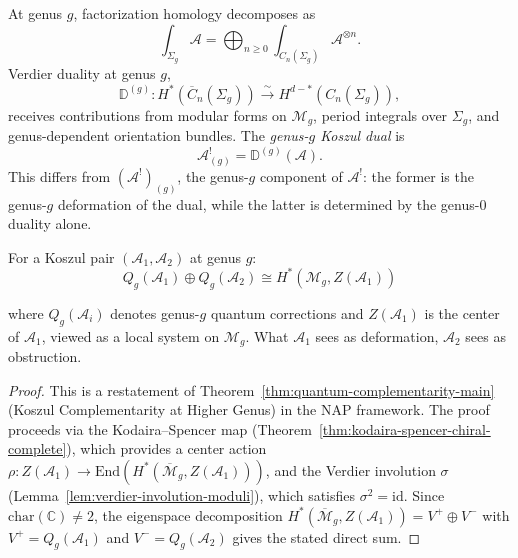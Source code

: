 \begin{definition}\label{def:genus-NAP}
At genus $g$, factorization homology decomposes as
\[\int_{\Sigma_g} \mathcal{A} = \bigoplus_{n \geq 0} \int_{C_n(\Sigma_g)} \mathcal{A}^{\otimes n}.\]
Verdier duality at genus $g$,
\[\mathbb{D}^{(g)}: H^*(\overline{C}_n(\Sigma_g)) \xrightarrow{\sim} H^{d-*}(C_n(\Sigma_g)),\]
receives contributions from modular forms on $\mathcal{M}_g$, period integrals over $\Sigma_g$, and genus-dependent orientation bundles.  The \emph{genus-$g$ Koszul dual} is
\[\mathcal{A}^!_{(g)} = \mathbb{D}^{(g)}(\mathcal{A}).\]
This differs from $(\mathcal{A}^!)_{(g)}$, the genus-$g$ component of $\mathcal{A}^!$: the former is the genus-$g$ deformation of the dual, while the latter is determined by the genus-$0$ duality alone.
\end{definition}

\begin{theorem}\label{thm:genus-complementarity}
For a Koszul pair $(\mathcal{A}_1, \mathcal{A}_2)$ at genus $g$:
\[Q_g(\mathcal{A}_1) \oplus Q_g(\mathcal{A}_2) \cong H^*(\mathcal{M}_g, Z(\mathcal{A}_1))\]

where $Q_g(\mathcal{A}_i)$ denotes genus-$g$ quantum corrections and $Z(\mathcal{A}_1)$ is the center of $\mathcal{A}_1$, viewed as a local system on $\mathcal{M}_g$.  What $\mathcal{A}_1$ sees as deformation, $\mathcal{A}_2$ sees as obstruction.
\end{theorem}

\begin{proof}
This is a restatement of Theorem~\ref{thm:quantum-complementarity-main} (Koszul Complementarity at Higher Genus) in the NAP framework. The proof proceeds via the Kodaira--Spencer map (Theorem~\ref{thm:kodaira-spencer-chiral-complete}), which provides a center action $\rho: Z(\mathcal{A}_1) \to \mathrm{End}(H^*(\overline{\mathcal{M}}_g, Z(\mathcal{A}_1)))$, and the Verdier involution $\sigma$ (Lemma~\ref{lem:verdier-involution-moduli}), which satisfies $\sigma^2 = \mathrm{id}$.  Since $\mathrm{char}(\mathbb{C}) \neq 2$, the eigenspace decomposition $H^*(\overline{\mathcal{M}}_g, Z(\mathcal{A}_1)) = V^+ \oplus V^-$ with $V^+ = Q_g(\mathcal{A}_1)$ and $V^- = Q_g(\mathcal{A}_2)$ gives the stated direct sum.
\end{proof}

